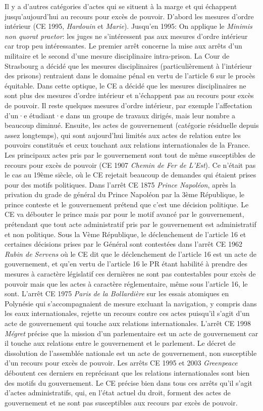 \documentclass[math]{cours}
\begin{document}
Il y a d'autres catégories d'actes qui se situent à la marge et qui échappent jusqu'aujourd'hui au recours pour excès de pouvoir.
D'abord les mesures d'ordre intérieur (CE 1995, \emph{Hardouin} et \emph{Marie}). Jusqu'en 1995: On applique le \emph{Minimis non quorat praetor}: les juges ne s'intéressent pas aux mesures d'ordre intérieur car trop peu intéressantes.
Le premier arrêt concerne la mise aux arrêts d'un militaire et le second d'une mesure disciplinaire intra-prison.
La Cour de Strasbourg a décidé que les mesures disciplinaires (particulièrement à l'intérieur des prisons) rentraient dans le domaine pénal en vertu de l'article 6 sur le procès équitable.
Dans cette optique, le CE a décidé que les mesures disciplinaires ne sont plus des mesures d'ordre intérieur et n'échappent pas au recours pour excès de pouvoir.
Il reste quelques mesures d'ordre intérieur, par exemple l'affectation d'un·e étudiant·e dans un groupe de travaux dirigés, mais leur nombre a beaucoup diminué.
Ensuite, les actes de gouvernement (catégorie résiduelle depuis assez longtemps), qui sont aujourd'hui limités aux actes de relation entre les pouvoirs constitués et ceux touchant aux relations internationales de la France.
Les principaux actes pris par le gouvernement sont tout de même susceptibles de recours pour excès de pouvoir (CE 1907 \emph{Chemin de Fer de L'Est}).
Ce n'était pas le cas au 19ème siècle, où le CE rejetait beaucoup de demandes qui étaient prises pour des motifs politiques.
Dans l'arrêt CE 1875 \emph{Prince Napoléon}, après la privation du grade de général du Prince Napoléon par la 3ème République, le prince conteste et le gouvernement prétend que c'est une décision politique.
Le CE va débouter le prince mais par pour le motif avancé par le gouvernement, prétendant que tout acte administratif pris par le gouvernement est administratif et non politique.
Sous la Vème République, le déclenchement de l'article 16 et certaines décisions prises par le Général sont contestées dans l'arrêt CE 1962 \emph{Rubin de Servens} où le CE dit que le déclenchement de l'article 16 est un acte de gouvernement, et qu'en vertu de l'article 16 le PR étant habilité à prendre des mesures à caractère législatif ces dernières ne sont pas contestables pour excès de pouvoir mais que les actes à caractère réglementaire, même sous l'article 16, le sont.
L'arrêt CE 1975 \emph{Paris de la Bollardière} sur les essais atomiques en Polynésie qui s'accompagnaient de mesure excluant la navigation, y compris dans les eaux internationales, rejette un recours contre ces actes puisqu'il s'agit d'un acte de gouvernement qui touche aux relations internationales.
L'arrêt CE 1998 \emph{Mégret} précise que la mission d'un parlementaire est un acte de gouvernement car il touche aux relations entre le gouvernement et le parlement. Le décret de dissolution de l'assemblée nationale est un acte de gouvernement, non susceptible d'un recours pour excès de pouvoir.
Les arrêts CE 1995 et 2003 \emph{Greenpeace} déboutent ces derniers en reprécisant que les relations internationales sont bien des motifs du gouvernement.
Le CE précise bien dans tous ces arrêts qu'il s'agit d'actes administratifs, qui, en l'état actuel du droit, forment des actes de gouvernement et ne sont pas susceptibles aux recours par excès de pouvoir.
\end{document}
